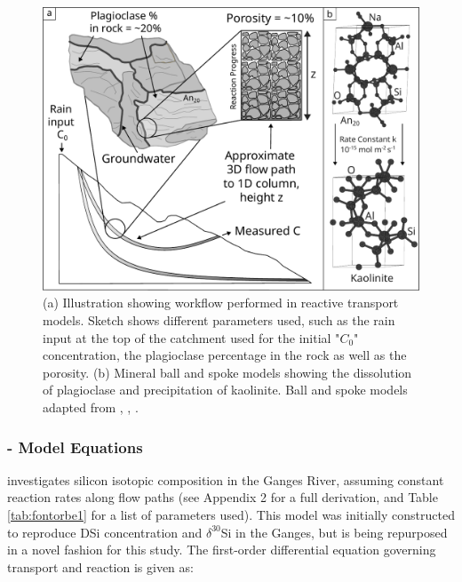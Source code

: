 \begin{figure}[h]
    \centering
    \includegraphics[width=\textwidth]{sketch.pdf}
    \caption{(a) Illustration showing workflow performed in reactive transport models. Sketch shows different parameters used, such as the rain input at the top of the catchment used for the initial "$C_0$" concentration, the plagioclase percentage in the rock as well as the porosity. (b) Mineral ball and spoke models showing the dissolution of plagioclase and precipitation of kaolinite. Ball and spoke models adapted from \textcite{vaitkusWorkflowDerivingChemical2023}, \textcite{grazulisComputingStoichiometricMolecular2015}, \textcite{downsAmericanMineralogistCrystal2003}.}
    \label{fig:reactsketch}
\end{figure}

\FloatBarrier

\newpage

\subsubsection*{\textcite{fontorbeSiliconIsotopicComposition2013} - Model Equations}

\textcite{fontorbeSiliconIsotopicComposition2013} investigates silicon isotopic composition in the Ganges River, assuming constant reaction rates along flow paths (see Appendix 2 for a full derivation, and Table \ref{tab:fontorbe1} for a list of parameters used). This model was initially constructed to reproduce DSi concentration and $\delta^{30}$Si in the Ganges, but is being repurposed in a novel fashion for this study. The first-order differential equation governing transport and reaction is given as:\\

